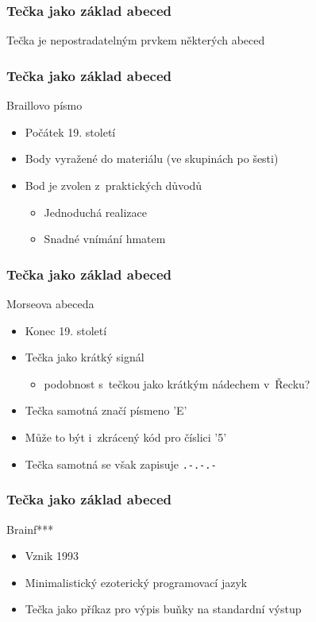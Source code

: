 \documentclass{beamer}
\begin{document}
    \section[Základ abeced]{}
    \begin{frame}
        \frametitle{Tečka jako základ abeced}
        Tečka je nepostradatelným prvkem některých abeced
    \end{frame}
    \begin{frame}
        \frametitle{Tečka jako základ abeced}
        \alert{Braillovo písmo}\\
        \begin{itemize}
            \item Počátek 19. století
            \item Body vyražené do materiálu (ve skupinách po šesti)
            \item Bod je zvolen z~praktických důvodů
            \begin{itemize}
                \item Jednoduchá realizace
                \item Snadné vnímání hmatem
            \end{itemize}
        \end{itemize}
    \end{frame}
    \begin{frame}
        \frametitle{Tečka jako základ abeced}
        \alert{Morseova abeceda}\\
        \begin{itemize}
            \item Konec 19. století
            \item Tečka jako krátký signál
            \begin{itemize}
                \item podobnost s~tečkou jako krátkým nádechem v~Řecku?
            \end{itemize}
            \item Tečka samotná značí písmeno 'E'
            \item Může to být i~zkrácený kód pro číslici '5'
            \item Tečka samotná se však zapisuje \texttt{.-.-.-}
        \end{itemize}
    \end{frame}
    \begin{frame}
        \frametitle{Tečka jako základ abeced}
        \alert{Brainf***}\\
        \begin{itemize}
            \item Vznik 1993
            \item Minimalistický ezoterický programovací jazyk
            \item Tečka jako příkaz pro výpis buňky na standardní výstup
        \end{itemize}
    \end{frame}
\end{document}
